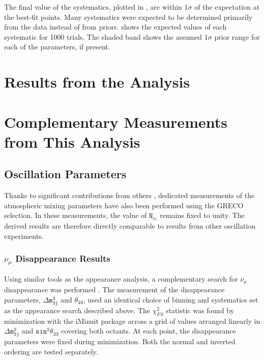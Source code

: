 The final value of the systematics, plotted in , are within 1$\mathtt{\sigma}$ of the expectation at the best-fit points.
Many systematics were expected to be determined primarily from the data instead of from priors. 
 shows the expected values of each systematic for 1000 trials.
The shaded band shows the assumed 1$\mathtt{\sigma}$ prior range for each of the parameters, if present.



\label{section:tau_results}
\section{Results from the Analysis}


\label{section:other_measurements}
\section{Complementary Measurements from This Analysis}

\label{subsec:oscil_results}
\subsection{Oscillation Parameters}
Thanks to significant contributions from others , dedicated measurements of the atmospheric mixing parameters have also been performed using the GRECO selection.
In these measurements, the value of $\mathtt{N_{\nu_\tau}}$ remains fixed to unity.
The derived results are therefore directly comparable to results from other oscillation experiments.

\label{subsubsec:disappearance_results}
\subsubsection{$\nu_\mu$ Disappearance Results}
Using similar tools as the appearance analysis, a complementary search for $\mathtt{\nu_\mu}$ disappearance was performed .
The measurement of the disappearance parameters, $\mathtt{\Delta m^2_{3j}}$ and $\mathtt{\theta_{23}}$, used an identical choice of binning and systematics set as the appearance search described above.
The $\chi^2_{FS}$ statistic was found by minimization with the iMinuit package  across a grid of values arranged linearly in $\mathtt{\Delta m^2_{3j}}$ and $\mathtt{sin^2\theta_{23}}$ covering both octants.
At each point, the disappearance parameters were fixed during minimization.
Both the normal and inverted ordering are tested separately.

